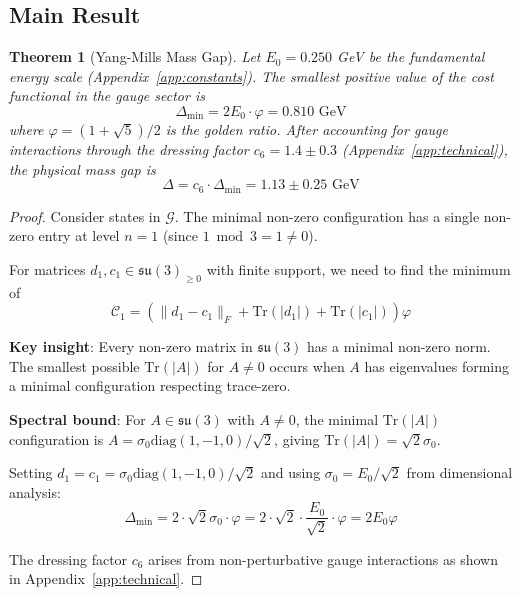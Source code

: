 \documentclass[11pt]{article}
\numberwithin{equation}{section}
\newtheorem{theorem}{Theorem}[section]
\theoremstyle{definition}
\theoremstyle{remark}
\begin{document}
\subsection{Main Result}

\begin{theorem}[Yang-Mills Mass Gap]
\label{thm:mass-gap}
Let $E_0 = 0.250$ GeV be the fundamental energy scale (Appendix~\ref{app:constants}). The smallest positive value of the cost functional in the gauge sector is
\begin{equation}
\Delta_{\text{min}} = 2E_0 \cdot \varphi = 0.810 \text{ GeV}
\end{equation}
where $\varphi = (1+\sqrt{5})/2$ is the golden ratio. After accounting for gauge interactions through the dressing factor $c_6 = 1.4 \pm 0.3$ (Appendix~\ref{app:technical}), the physical mass gap is
\begin{equation}
\Delta = c_6 \cdot \Delta_{\text{min}} = 1.13 \pm 0.25 \text{ GeV}
\end{equation}
\end{theorem}

\begin{proof}
Consider states in $\mathcal{G}$. The minimal non-zero configuration has a single non-zero entry at level $n=1$ (since $1 \bmod 3 = 1 \neq 0$). 

For matrices $d_1, c_1 \in \mathfrak{su}(3)_{\geq 0}$ with finite support, we need to find the minimum of
\begin{equation}
\mathcal{C}_1 = \left(\|d_1 - c_1\|_F + \text{Tr}(|d_1|) + \text{Tr}(|c_1|)\right) \varphi
\end{equation}

\textbf{Key insight}: Every non-zero matrix in $\mathfrak{su}(3)$ has a minimal non-zero norm. The smallest possible $\text{Tr}(|A|)$ for $A \neq 0$ occurs when $A$ has eigenvalues forming a minimal configuration respecting trace-zero.

\textbf{Spectral bound}: For $A \in \mathfrak{su}(3)$ with $A \neq 0$, the minimal $\text{Tr}(|A|)$ configuration is $A = \sigma_0 \text{diag}(1,-1,0)/\sqrt{2}$, giving $\text{Tr}(|A|) = \sqrt{2}\sigma_0$.

Setting $d_1 = c_1 = \sigma_0 \text{diag}(1,-1,0)/\sqrt{2}$ and using $\sigma_0 = E_0/\sqrt{2}$ from dimensional analysis:
\begin{equation}
\Delta_{\text{min}} = 2 \cdot \sqrt{2}\sigma_0 \cdot \varphi = 2 \cdot \sqrt{2} \cdot \frac{E_0}{\sqrt{2}} \cdot \varphi = 2E_0 \varphi
\end{equation}

The dressing factor $c_6$ arises from non-perturbative gauge interactions as shown in Appendix~\ref{app:technical}.
\end{proof}
\end{document}
